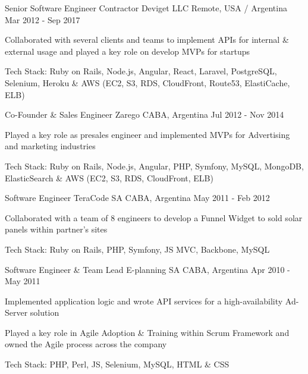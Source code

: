 \begin{cventries}
  \cventry
    {Senior Software Engineer Contractor}
    {Deviget LLC}
    {Remote, USA / Argentina}
    {Mar 2012 - Sep 2017}
    {
      \begin{cvitems}
        \item {Collaborated with several clients and teams to implement APIs for internal \& external usage and played a key role on develop MVPs for startups}
        \item {Tech Stack: Ruby on Rails, Node.js, Angular, React, Laravel, PostgreSQL, Selenium, Heroku \& AWS (EC2, S3, RDS, CloudFront, Route53, ElastiCache, ELB)}
      \end{cvitems}
    }

  \cventry
    {Co-Founder \& Sales Engineer}
    {Zarego}
    {CABA, Argentina}
    {Jul 2012 - Nov 2014}
    {
      \begin{cvitems}
        \item {Played a key role as presales engineer and implemented MVPs for Advertising and marketing industries}
        \item {Tech Stack: Ruby on Rails, Node.js, Angular, PHP, Symfony, MySQL, MongoDB, ElasticSearch \& AWS (EC2, S3, RDS, CloudFront, ELB)}
      \end{cvitems}
    }

  \cventry
    {Software Engineer}
    {TeraCode SA}
    {CABA, Argentina}
    {May 2011 - Feb 2012}
    {
      \begin{cvitems}
        \item {Collaborated with a team of 8 engineers to develop a Funnel Widget to sold solar panels within partner's sites}
        \item {Tech Stack: Ruby on Rails, PHP, Symfony, JS MVC, Backbone, MySQL}
      \end{cvitems}
    }

  \cventry
    {Software Engineer \& Team Lead}
    {E-planning SA}
    {CABA, Argentina}
    {Apr 2010 - May 2011}
    {
      \begin{cvitems}
        \item {Implemented application logic and wrote API services for a high-availability Ad-Server solution}
        \item {Played a key role in Agile Adoption \& Training within Scrum Framework and owned the Agile process across the company}
        \item {Tech Stack: PHP, Perl, JS, Selenium, MySQL, HTML \& CSS}
      \end{cvitems}
    }

\end{cventries}
